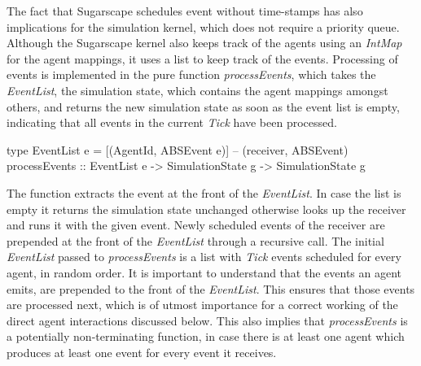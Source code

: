 The fact that Sugarscape schedules event without time-stamps has also implications for the simulation kernel, which does not require a priority queue. Although the Sugarscape kernel also keeps track of the agents using an \textit{IntMap} for the agent mappings, it uses a list to keep track of the events. Processing of events is implemented in the pure function \textit{processEvents}, which takes the \textit{EventList}, the simulation state, which contains the agent mappings amongst others, and returns the new simulation state as soon as the event list is empty, indicating that all events in the current \textit{Tick} have been processed.

\begin{HaskellCode}
type EventList e = [(AgentId, ABSEvent e)] -- (receiver, ABSEvent)
processEvents :: EventList e -> SimulationState g -> SimulationState g
\end{HaskellCode}

The function extracts the event at the front of the \textit{EventList}. In case the list is empty it returns the simulation state unchanged otherwise looks up the receiver and runs it with the given event. Newly scheduled events of the receiver are prepended at the front of the \textit{EventList} through a recursive call. The initial \textit{EventList} passed to \textit{processEvents} is a list with \textit{Tick} events scheduled for every agent, in random order. It is important to understand that the events an agent emits, are prepended to the front of the \textit{EventList}. This ensures that those events are processed next, which is of utmost importance for a correct working of the direct agent interactions discussed below. This also implies that \textit{processEvents} is a potentially non-terminating function, in case there is at least one agent which produces at least one event for every event it receives.